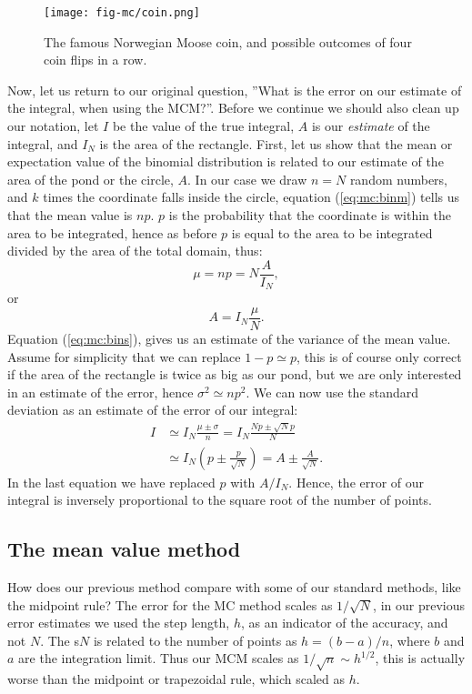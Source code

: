\documentclass[graybox,sectrefs,envcountresetchap,open=right,final]{svmonodo}
\begin{document}
\begin{figure}[!ht]  %
  \centerline{\texttt{[image: fig-mc/coin.png]}}
  \caption{
  The famous Norwegian Moose coin, and possible outcomes of four coin flips in a row. \label{fig:mc:coin}
  }
\end{figure}

Now, let us return to our original question, ''What is the error on our
estimate of the integral, when using the MCM?''. Before we continue we
should also clean up our notation, let $I$ be the value of the true
integral, $A$ is our \emph{estimate} of the integral, and $I_N$ is the area
of the rectangle. First, let us show
that the mean or expectation value of the binomial distribution is
related to our estimate of the area of the pond or the circle, $A$. In our case we draw $n=N$
random numbers, and $k$ times the coordinate falls inside the circle,
equation (\ref{eq:mc:binm}) tells us that the mean value is $np$. $p$
is the probability that the coordinate is within the area to be
integrated, hence as before $p$ is equal to the area to be integrated
divided by the area of the total domain, thus:
\begin{equation}
\mu=np=N\frac{A}{I_N},
\end{equation}
or
\begin{equation}
A=I_N\frac{\mu}{N}.
\end{equation}
Equation (\ref{eq:mc:bins}), gives us an estimate of the variance of
the mean value. Assume for simplicity that we can replace $1-p\simeq
p$, this is of course only correct if the area of the rectangle is
twice as big as our pond, but we are only interested in an
estimate of the error, hence $\sigma^2\simeq np^2$. We can now use the
standard deviation as an estimate of the error of our integral:
\begin{align}
I&\simeq I_N\frac{\mu\pm\sigma}{n}=I_N\frac{Np\pm \sqrt{N}p}{N}\nonumber\\ 
&\simeq I_N(p\pm \frac{p}{\sqrt{N}})=A\pm \frac{A}{\sqrt{N}}.
\label{eq:mc:mcmf}
\end{align}
In the last equation we have replaced $p$ with $A/I_N$. 
Hence, the error of our integral is inversely proportional to the
square root of the number of points. 

\subsection{The mean value method}
How does our previous method compare with some of our standard methods,
like the midpoint rule? The error for the MC method scales as
$1/\sqrt{N}$, in our previous error estimates we used the step length,
$h$, as an indicator of the accuracy, and not $N$. The s$N$ is
related to the number of points as $h=(b-a)/n$, where $b$ and $a$ are
the integration limit. Thus our MCM scales as $1/\sqrt{n}\sim
h^{1/2}$, this is actually worse than the midpoint or trapezoidal
rule, which scaled as $h$.
\end{document}
